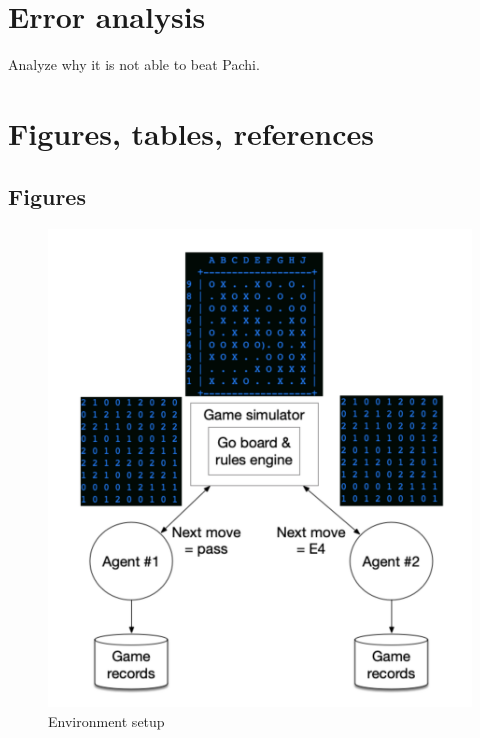 \documentclass{article}
\begin{document}
\section{Error analysis}
Analyze why it is not able to beat Pachi. 



\section{Figures, tables, references}
\subsection{Figures}
\begin{figure}
\centering
\includegraphics[width=0.8\linewidth]{simulator}
\caption{Environment setup}
\label{fig:env}
\end{figure}

 
\end{document}

